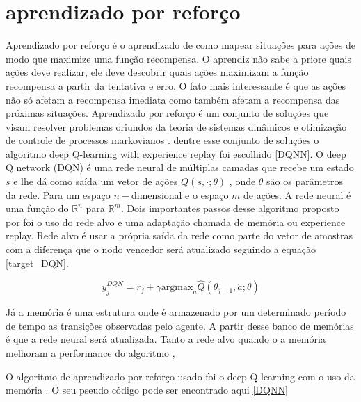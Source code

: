 \documentclass[
	12pt,				%
	openright,			%
	oneside,			%
	a4paper,			%
	brazil,				%
	]{abntex2}
\begin{document}
\section{aprendizado por reforço}
Aprendizado por reforço é o aprendizado de como mapear situações para ações de modo que maximize uma função recompensa. O aprendiz não sabe a priore quais ações deve realizar, ele deve descobrir quais ações maximizam a função recompensa a partir da tentativa e erro. O fato mais interessante é que as ações não só afetam a recompensa imediata como também afetam a recompensa das próximas situações. Aprendizado por reforço é um conjunto de soluções que visam resolver problemas oriundos da teoria de sistemas dinâmicos e otimização de controle de processos markovianos \cite{sutton2018reinforcement}. dentre esse conjunto de soluções o algoritmo deep Q-learning with experience replay foi escolhido \ref{DQNN}. O deep Q network (DQN) é uma rede neural de múltiplas camadas que recebe um estado $s$ e lhe dá como saída um vetor de ações $Q(s, \cdot ;\theta)$ , onde $\theta$ são os parâmetros da rede. Para um espaço $n-$dimensional e o espaço $m$ de ações. A rede neural é uma função do  $\mathbb{R}^n$ para $\mathbb{R}^m$. Dois importantes passos desse algoritmo proposto por \cite{mnih2015human} foi o uso do rede alvo e uma adaptação chamada de memória ou experience replay. Rede alvo é usar a própria saída da rede como parte do vetor de amostras com a diferença que o nodo vencedor será atualizado seguindo a equação \ref{target_DQN}.

\begin{equation}\label{target_DQN}
 y^{DQN}_j = r_j + \gamma\textrm{argmax}_{\acute{a}}\hat{Q}(\theta_{j+1},\acute{a};\bar{\theta})
\end{equation}

Já a memória é uma estrutura onde é armazenado por um determinado período de tempo as transições observadas pelo agente. A partir desse banco de memórias é que a rede neural será atualizada. Tanto a rede alvo quando o a memória melhoram a performance do algoritmo \cite{van2016deep} , \cite{mnih2015human}

O algoritmo de aprendizado por reforço usado foi o deep Q-learning com o uso da memória \cite{mnih2015human}. O seu pseudo código pode ser encontrado aqui \ref{DQNN}
\end{document}

